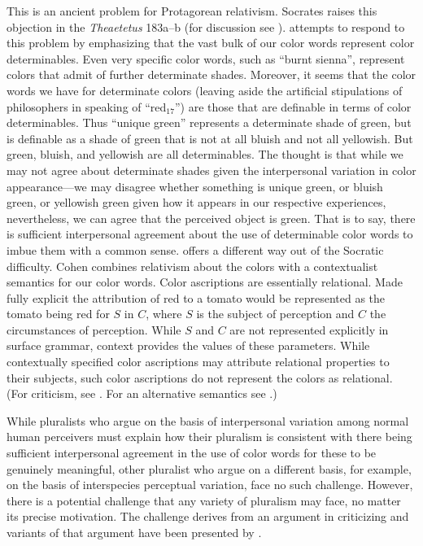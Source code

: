 \documentclass[12pt]{article}
\begin{document}
This is an ancient problem for Protagorean relativism. Socrates raises this objection in the \emph{Theaetetus} 183a--b (for discussion see \citealt{Burnyeat:1990dp}). \citet{Kalderon:2006tg} attempts to respond to this problem by emphasizing that the vast bulk of our color words represent color determinables. Even very specific color words, such as ``burnt sienna'', represent colors that admit of further determinate shades. Moreover, it seems that the color words we have for determinate colors (leaving aside the artificial stipulations of philosophers in speaking of ``red\( _{17} \)'') are those that are definable in terms of color determinables. Thus ``unique green'' represents a determinate shade of green, but is definable as a shade of green that is not at all bluish and not all yellowish. But green, bluish, and yellowish are all determinables. The thought is that while we may not agree about determinate shades given the interpersonal variation in color appearance---we may disagree whether something is unique green, or bluish green, or yellowish green given how it appears in our respective experiences, nevertheless, we can agree that the perceived object is green. That is to say, there is sufficient interpersonal agreement about the use of determinable color words to imbue them with a common sense. \citet{Cohen:2009lq} offers a different way out of the Socratic difficulty. Cohen combines relativism about the colors with a contextualist semantics for our color words. Color ascriptions are essentially relational. Made fully explicit the attribution of red to a tomato would be represented as the tomato being red for \( S \) in \( C \), where \( S \) is the subject of perception and \( C \) the circumstances of perception. While \( S \) and \( C \) are not represented explicitly in surface grammar, context provides the values of these parameters. While contextually specified color ascriptions may attribute relational properties to their subjects, such color ascriptions do not represent the colors as relational. (For criticism, see \citealt{Allen:2012ty,Gert:2012es}. For an alternative semantics see \citealt{Egan:2006fk,Egan:2010aa}.)

While pluralists who argue on the basis of interpersonal variation among normal human perceivers must explain how their pluralism is consistent with there being sufficient interpersonal agreement in the use of color words for these to be genuinely meaningful, other pluralist who argue on a different basis, for example, on the basis of interspecies perceptual variation, face no such challenge. However, there is a potential challenge that any variety of pluralism may face, no matter its precise motivation. The challenge derives from an argument in \citet{Shoemaker:2003wk} criticizing \citet{Hilbert:2000on} and variants of that argument have been presented by \citet{Pautz:2006as,Pautz:2009fk,Cohen:2009lq,Pautz:2011aa}.
\end{document}
